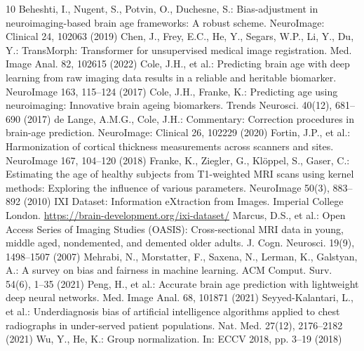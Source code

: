 \documentclass[runningheads]{llncs}
\begin{document}
\clearpage
\begin{thebibliography}{10}
 Beheshti, I., Nugent, S., Potvin, O., Duchesne, S.: Bias-adjustment in neuroimaging-based brain age frameworks: A robust scheme. NeuroImage: Clinical 24, 102063 (2019)
 Chen, J., Frey, E.C., He, Y., Segars, W.P., Li, Y., Du, Y.: TransMorph: Transformer for unsupervised medical image registration. Med. Image Anal. 82, 102615 (2022)
 Cole, J.H., et al.: Predicting brain age with deep learning from raw imaging data results in a reliable and heritable biomarker. NeuroImage 163, 115--124 (2017)
 Cole, J.H., Franke, K.: Predicting age using neuroimaging: Innovative brain ageing biomarkers. Trends Neurosci. 40(12), 681--690 (2017)
 de Lange, A.M.G., Cole, J.H.: Commentary: Correction procedures in brain-age prediction. NeuroImage: Clinical 26, 102229 (2020)
 Fortin, J.P., et al.: Harmonization of cortical thickness measurements across scanners and sites. NeuroImage 167, 104--120 (2018)
 Franke, K., Ziegler, G., Kl{\"o}ppel, S., Gaser, C.: Estimating the age of healthy subjects from T1-weighted MRI scans using kernel methods: Exploring the influence of various parameters. NeuroImage 50(3), 883--892 (2010)
 IXI Dataset: Information eXtraction from Images. Imperial College London. \url{https://brain-development.org/ixi-dataset/}
 Marcus, D.S., et al.: Open Access Series of Imaging Studies (OASIS): Cross-sectional MRI data in young, middle aged, nondemented, and demented older adults. J. Cogn. Neurosci. 19(9), 1498--1507 (2007)
 Mehrabi, N., Morstatter, F., Saxena, N., Lerman, K., Galstyan, A.: A survey on bias and fairness in machine learning. ACM Comput. Surv. 54(6), 1--35 (2021)
 Peng, H., et al.: Accurate brain age prediction with lightweight deep neural networks. Med. Image Anal. 68, 101871 (2021)
 Seyyed-Kalantari, L., et al.: Underdiagnosis bias of artificial intelligence algorithms applied to chest radiographs in under-served patient populations. Nat. Med. 27(12), 2176--2182 (2021)
 Wu, Y., He, K.: Group normalization. In: ECCV 2018, pp. 3--19 (2018)
\end{thebibliography}
\end{document}
